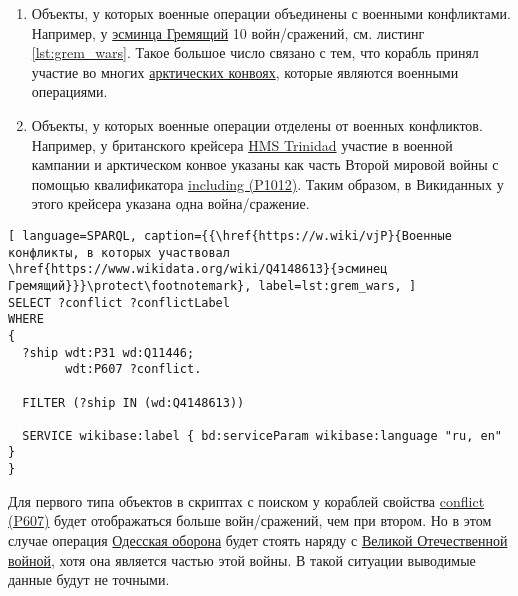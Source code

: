\begin{enumerate}
  \item Объекты, у которых военные операции объединены с военными конфликтами. Например, у \href{https://www.wikidata.org/wiki/Q4148613}{эсминца Гремящий} 10 войн/сражений, см. листинг \ref{lst:grem_wars}. Такое большое число связано с тем, что корабль принял участие во многих \href{https://ru.wikipedia.org/wiki/Арктические_конвои}{арктических конвоях}, которые являются военными операциями.
  \item Объекты, у которых военные операции отделены от военных конфликтов. Например, у британского крейсера \href{https://ru.wikipedia.org/wiki/HMS_Trinidad_(1940)}{HMS Trinidad} участие в военной кампании и арктическом конвое указаны как часть Второй мировой войны с помощью квалификатора \href{https://www.wikidata.org/wiki/Property:P1012}{including (P1012)}. Таким образом, в Викиданных у этого крейсера указана одна война/сражение.
\end{enumerate}


\label{question:ship_3}


\begin{lstlisting}[ language=SPARQL, caption={{\href{https://w.wiki/vjP}{Военные конфликты, в которых участвовал \href{https://www.wikidata.org/wiki/Q4148613}{эсминец Гремящий}}}\protect\footnotemark}, label=lst:grem_wars, ]
SELECT ?conflict ?conflictLabel
WHERE
{
  ?ship wdt:P31 wd:Q11446;
        wdt:P607 ?conflict.
    
  FILTER (?ship IN (wd:Q4148613))
              
  SERVICE wikibase:label { bd:serviceParam wikibase:language "ru, en" }
}
\end{lstlisting}

Для первого типа объектов в скриптах с поиском у кораблей свойства \href{https://www.wikidata.org/wiki/Property:P607}{conflict (P607)} будет отображаться больше войн/сражений, чем при втором. Но в этом случае операция \href{https://ru.wikipedia.org/wiki/Одесская_оборона_(1941)}{Одесская оборона} будет стоять наряду с \href{https://ru.wikipedia.org/wiki/Великая_Отечественная_война}{Великой Отечественной войной}, хотя она является частью этой войны. В такой ситуации выводимые данные будут не точными.

